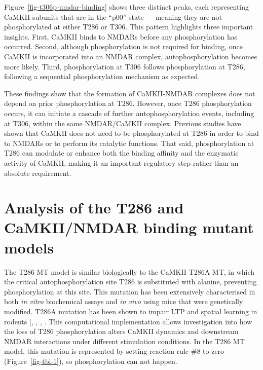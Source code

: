 \documentclass[
  11pt,
  letterpaper,
]{scrreprt}
\begin{document}
Figure~\ref{fig-t306p-nmdar-binding} shows three distinct peaks, each
representing CaMKII subunits that are in the ``p00'' state --- meaning
they are not phosphorylated at either T286 or T306. This pattern
highlights three important insights. First, CaMKII binds to NMDARs
before any phosphorylation has occurred. Second, although
phosphorylation is not required for binding, once CaMKII is incorporated
into an NMDAR complex, autophosphorylation becomes more likely. Third,
phosphorylation at T306 follows phosphorylation at T286, following a
sequential phosphorylation mechanism as expected.

These findings show that the formation of CaMKII-NMDAR complexes does
not depend on prior phosphorylation at T286. However, once T286
phosphorylation occurs, it can initiate a cascade of further
autophosphorylation events, including at T306, within the same
NMDAR/CaMKII complex. Previous studies have shown that CaMKII does not
need to be phosphorylated at T286 in order to bind to NMDARs or to
perform its catalytic functions. That said, phosphorylation at T286 can
modulate or enhance both the binding affinity and the enzymatic activity
of CaMKII, making it an important regulatory step rather than an
absolute requirement.

\section{Analysis of the T286 and CaMKII/NMDAR binding mutant
models}\label{analysis-of-the-t286-and-camkiinmdar-binding-mutant-models}

The T286 MT model is similar biologically to the CaMKII T286A MT, in
which the critical autophosphorylation site T286 is substituted with
alanine, preventing phosphorylation at this site. This mutation has been
extensively characterised in both \emph{in vitro} biochemical assays and
\emph{in vivo} using mice that were genetically modified. T286A mutation
has been shown to impair LTP and spatial learning in rodents
{[},
,
,
\citeproc{ref-lou1986Activation}{468}{]}. This computational
implementation allows investigation into how the loss of T286
phosphorylation alters CaMKII dynamics and downstream NMDAR interactions
under different stimulation conditions. In the T286 MT model, this
mutation is represented by setting reaction rule \#8 to zero
(Figure~\ref{fig-tbl-1}), so phosphorylation can not happen.
\end{document}
